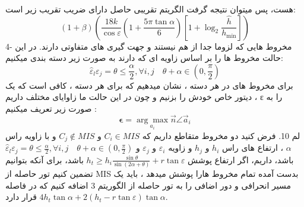 \documentclass[12pt]{book}
\begin{document}
هست، پس میتوان نتیجه گرفت الگریتم تقریبی حاصل دارای ضریب تقریب زیر است:
\begin{equation}
(1+\beta)\left(\frac{18 k}{\cos \varepsilon}\left(1+\frac{5 \pi \tan \alpha}{6}\right)\left[1+\log _{2} \frac{\hat{h}}{h_{\min }}\right]\right)
\end{equation}
4-
مخروط هایی که لزوما جدا از هم نیستند و جهت گیری های متفاوتی دارند.
در این حالت مخروط ها را بر اساس زاویه ای که دارند به صورت زیر دسته بندی میکنیم:
\begin{equation}
\widehat{\varepsilon}_{l} \varepsilon_{j}=\theta \leq \frac{\alpha}{2}, \forall i, j \quad \theta+\alpha \in\left(0, \frac{\pi}{2}\right)
\end{equation}
برای مخروط های در هر دسته ، نشان میدهیم که برای هر دسته ، کافی است که یک دیتور خاص خودش را بزنیم و چون در این حالت ما زاوایای مختلف داریم ،
 ε 
را به صورت زیر تعریف میکنیم :
\begin{equation}
\boldsymbol{\epsilon}=\underset{a_{i}}{\arg \max } \vec{n} \angle \vec{a}_{i}
\end{equation}
لم 10.
فرض کنید دو مخروط متقاطع داریم که 
$C_{i} \in M I S$
و 
$C_{j} \notin M I S$
و با زاویه راس 
$\alpha$
، ارتفاع های راس
$h_{i} $
و
$h_{j} $
و زاویه 
$\varepsilon_{i}$
و
$\varepsilon_{j}$
و
$\widehat{\varepsilon}_{l} \varepsilon_{j}=\theta \leq \frac{\alpha}{2}, \forall i, j \quad \theta+\alpha \in\left(0, \frac{\pi}{2}\right)$
باشد، داریم، اگر ارتفاع پوشش 
$h_{t} \geq h_{i} \frac{\sin \theta}{\sin (2 \alpha+\theta)}+r \tan \varepsilon$
باشد، برای آنکه بتوانیم تضمین کنیم تور حاصله از
 MIS 
بدست آمده تمام مخروط هارا پوشش میدهد ، باید یک مسیر انحرافی و دور اضافی را به تور حاصله از الگوریتم 3 اضافه کنیم که در فاصله 
$4 h_{t} \tan \alpha+2\left(h_{t}-r \tan \varepsilon\right) \tan \alpha$
قرار دارد.
\end{document}
